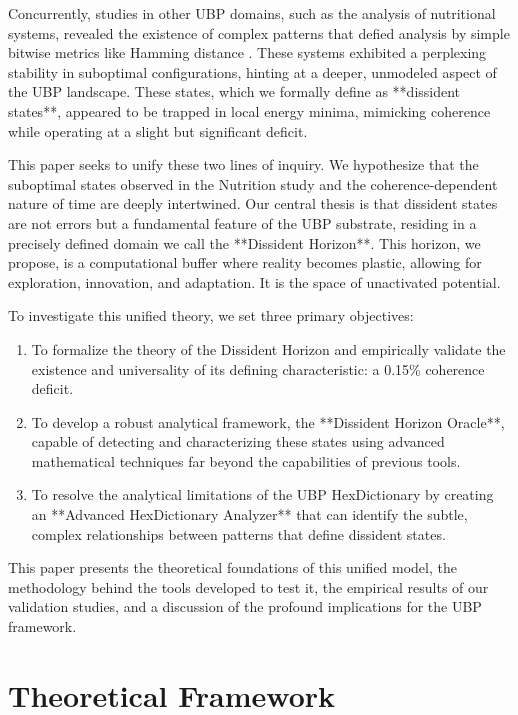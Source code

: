 \documentclass[12pt, a4paper]{article}
\begin{document}
Concurrently, studies in other UBP domains, such as the analysis of nutritional systems, revealed the existence of complex patterns that defied analysis by simple bitwise metrics like Hamming distance \cite{nutrition_study}. These systems exhibited a perplexing stability in suboptimal configurations, hinting at a deeper, unmodeled aspect of the UBP landscape. These states, which we formally define as **dissident states**, appeared to be trapped in local energy minima, mimicking coherence while operating at a slight but significant deficit.

This paper seeks to unify these two lines of inquiry. We hypothesize that the suboptimal states observed in the Nutrition study and the coherence-dependent nature of time are deeply intertwined. Our central thesis is that dissident states are not errors but a fundamental feature of the UBP substrate, residing in a precisely defined domain we call the **Dissident Horizon**. This horizon, we propose, is a computational buffer where reality becomes plastic, allowing for exploration, innovation, and adaptation. It is the space of unactivated potential.

To investigate this unified theory, we set three primary objectives:
\begin{enumerate}
    \item To formalize the theory of the Dissident Horizon and empirically validate the existence and universality of its defining characteristic: a 0.15\% coherence deficit.
    \item To develop a robust analytical framework, the **Dissident Horizon Oracle**, capable of detecting and characterizing these states using advanced mathematical techniques far beyond the capabilities of previous tools.
    \item To resolve the analytical limitations of the UBP HexDictionary by creating an **Advanced HexDictionary Analyzer** that can identify the subtle, complex relationships between patterns that define dissident states.
\end{enumerate}

This paper presents the theoretical foundations of this unified model, the methodology behind the tools developed to test it, the empirical results of our validation studies, and a discussion of the profound implications for the UBP framework.

\section{Theoretical Framework}
\end{document}
